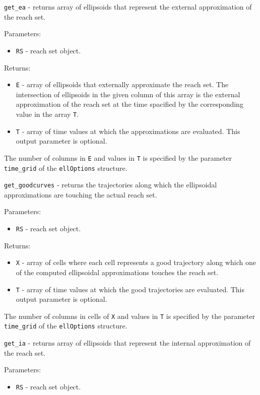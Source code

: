 \newpage

{\Large {\tt get\_ea}} - returns array of ellipsoids that represent the
external approximation of the reach set.

Parameters:
\begin{itemize}
\item {\tt RS} - reach set object.
\end{itemize}

Returns:
\begin{itemize}
\item {\tt E} - array of ellipsoids that externally approximate the reach set.
The intersection of ellipsoids in the given column of this array is
the external approximation of the reach set at the time spacified by the
corresponding value in the array {\tt T}.
\item {\tt T} - array of time values at which the approximations
are evaluated. This output parameter is optional.
\end{itemize}
The number of columns in {\tt E} and values in {\tt T} is specified by
the parameter {\tt time\_grid} of the {\tt ellOptions} structure.

\newpage

{\Large {\tt get\_goodcurves}} - returns the trajectories along which
the ellipsoidal approximations are touching the actual reach set.

Parameters:
\begin{itemize}
\item {\tt RS} - reach set object.
\end{itemize}

Returns:
\begin{itemize}
\item {\tt X} - array of cells where each cell represents a good trajectory
along which one of the computed ellipsoidal approximations touches the
reach set.
\item {\tt T} - array of time values at which the good trajectories
are evaluated. This output parameter is optional.
\end{itemize}
The number of columns in cells of {\tt X} and values in {\tt T} is specified by
the parameter {\tt time\_grid} of the {\tt ellOptions} structure.

\newpage

{\Large {\tt get\_ia}} - returns array of ellipsoids that represent the
internal approximation of the reach set.

Parameters:
\begin{itemize}
\item {\tt RS} - reach set object.
\end{itemize}

